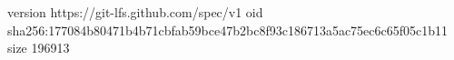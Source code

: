 version https://git-lfs.github.com/spec/v1
oid sha256:177084b80471b4b71cbfab59bce47b2bc8f93c186713a5ac75ec6c65f05c1b11
size 196913
